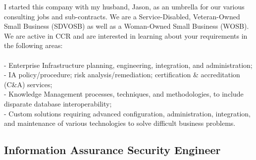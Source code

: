 \documentclass{article}
\begin{document}
{\noindent}I started this company with my husband, Jason, as an umbrella for our various consulting jobs and sub-contracts. We are a Service-Disabled, Veteran-Owned Small Business (SDVOSB) as well as a Woman-Owned Small Business (WOSB). We are active in CCR and are interested in learning about your requirements in the following areas:\\\\- Enterprise Infrastructure planning, engineering, integration, and administration;\\- IA policy/procedure; risk analysis/remediation; certification \& accreditation (C\&A) services;\\- Knowledge Management processes, techniques, and methodologies, to include disparate database interoperability;\\- Custom solutions requiring advanced configuration, administration, integration, and maintenance of various technologies to solve difficult business problems.
\\\subsection { Information Assurance Security Engineer }
\end{document}
